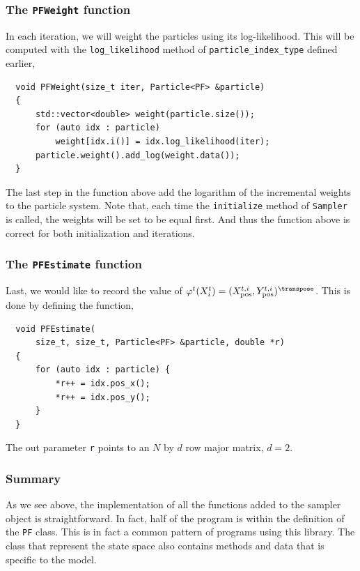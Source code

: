 \subsubsection{The \texttt{PFWeight} function}

In each iteration, we will weight the particles using its log-likelihood. This
will be computed with the \verb|log_likelihood| method of
\verb|particle_index_type| defined earlier,
\begin{Verbatim}
  void PFWeight(size_t iter, Particle<PF> &particle)
  {
      std::vector<double> weight(particle.size());
      for (auto idx : particle)
          weight[idx.i()] = idx.log_likelihood(iter);
      particle.weight().add_log(weight.data());
  }
\end{Verbatim}
The last step in the function above add the logarithm of the incremental
weights to the particle system. Note that, each time the \verb|initialize|
method of \verb|Sampler| is called, the weights will be set to be equal first.
And thus the function above is correct for both initialization and iterations.

\subsubsection{The \texttt{PFEstimate} function}

Last, we would like to record the value of $\varphi^t(X_i^t) =
(\xpos^{t,i},\ypos^{t,i})^{\transpose}$. This is done by defining the function,
\begin{Verbatim}
  void PFEstimate(
      size_t, size_t, Particle<PF> &particle, double *r)
  {
      for (auto idx : particle) {
          *r++ = idx.pos_x();
          *r++ = idx.pos_y();
      }
  }
\end{Verbatim}
The out parameter \verb|r| points to an $N$ by $d$ row major matrix, $d = 2$.

\subsubsection{Summary}

As we see above, the implementation of all the functions added to the sampler
object is straightforward. In fact, half of the program is within the
definition of the \verb|PF| class. This is in fact a common pattern of programs
using this library. The class that represent the state space also contains
methods and data that is specific to the model.

